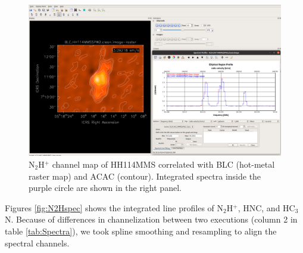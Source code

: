 \documentclass[a4paper, 10pt]{scrartcl}
\begin{document}
\begin{figure}[h]
	\centering
	\includegraphics[width=15cm]{HH114MMS-SPW2.png}
	\caption{N$_2$H$^+$ channel map of HH114MMS correlated with BLC (hot-metal raster map) and ACAC (contour). Integrated spectra inside the purple circle are shown in the right panel.}\label{fig:N2H+imageSpec}
\end{figure}

Figures \ref{fig:N2Hspec} shows the integrated line profiles of N$_2$H$^+$, HNC, and HC$_3$N.
Because of differences in channelization between two executions (column 2 in table \ref{tab:Spectra}), we took spline smoothing and resampling to align the spectral channels. 
\end{document}
